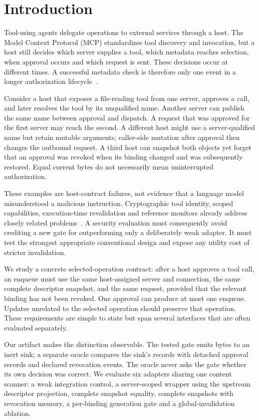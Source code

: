 \section{Introduction}
Tool-using agents delegate operations to external services through a host. The
Model Context Protocol (MCP) standardizes tool discovery and invocation, but a
host still decides which server supplies a tool, which metadata reaches selection,
when approval occurs and which request is sent. These decisions occur at different
times. A successful metadata check is therefore only one event in a longer
authorization lifecycle~\cite{mcp2025tools,mcp2026tools}.

Consider a host that exposes a file-reading tool from one server, approves a call,
and later resolves the tool by its unqualified name. Another server can publish
the same name between approval and dispatch. A request that was approved for the
first server may reach the second. A different host might use a server-qualified
name but retain mutable arguments; caller-side mutation after approval then changes
the outbound request. A third host can snapshot both objects yet forget that an
approval was revoked when its binding changed and was subsequently restored. Equal
current bytes do not necessarily mean uninterrupted authorization.

These examples are host-contract failures, not evidence that a language model
misunderstood a malicious instruction. Cryptographic tool identity, scoped
capabilities, execution-time revalidation and reference monitors already address
closely related problems~\cite{etdi,dynamiccapabilities,hcp,attested}. A security
evaluation must consequently avoid crediting a new gate for outperforming only a
deliberately weak adapter. It must test the strongest appropriate conventional
design and expose any utility cost of stricter invalidation.

We study a concrete selected-operation contract: after a host approves a tool call,
an enqueue must use the same host-assigned server and connection, the same complete
descriptor snapshot, and the same request, provided that the relevant binding has
not been revoked. One approval can produce at most one enqueue. Updates unrelated
to the selected operation should preserve that operation. These requirements are
simple to state but span several interfaces that are often evaluated separately.

Our artifact makes the distinction observable. The tested gate emits bytes to an
inert sink; a separate oracle compares the sink's records with detached approval
records and declared revocation events. The oracle never asks the gate whether its
own decision was correct. We evaluate six adapters sharing one content scanner:
a weak integration control, a server-scoped wrapper using the upstream descriptor
projection, complete snapshot equality, complete snapshots with revocation memory,
a per-binding generation gate and a global-invalidation ablation.


